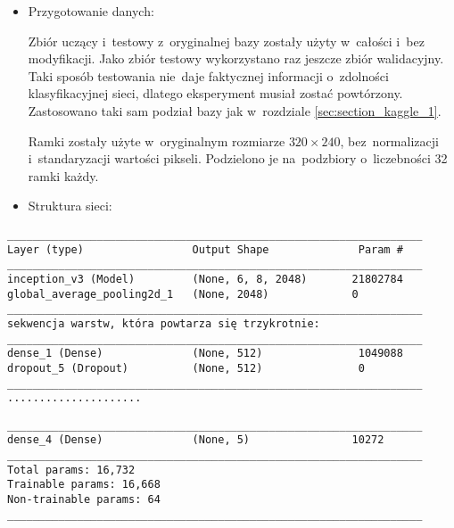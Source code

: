 {\parindent0pt %
\begin{itemize}
\item Przygotowanie danych:

Zbiór uczący i~testowy z~oryginalnej bazy zostały użyty w~całości i~bez modyfikacji. Jako zbiór testowy wykorzystano raz jeszcze zbiór walidacyjny. Taki sposób testowania nie~daje faktycznej informacji o~zdolności klasyfikacyjnej sieci, dlatego eksperyment musiał zostać powtórzony. Zastosowano taki sam podział bazy jak w~rozdziale \ref{sec:section_kaggle_1}.

Ramki zostały użyte w~oryginalnym rozmiarze $320\times240$, bez~normalizacji i~standaryzacji wartości pikseli. Podzielono je na~podzbiory o~liczebności 32 ramki każdy.
\item Struktura sieci:
\end{itemize}

\newsavebox\myvfff
\begin{lrbox}{\myvfff}
\setlength{\myminipagewidth}{0.9\linewidth} %
\setlength{\myminipagecentering}{(\linewidth-\myminipagewidth)/2}
\noindent\hspace{\myminipagecentering}\begin{minipage}{\myminipagewidth}
\begin{verbatim}
_________________________________________________________________
Layer (type)                 Output Shape              Param #   
_________________________________________________________________
inception_v3 (Model)         (None, 6, 8, 2048)       21802784  
global_average_pooling2d_1   (None, 2048)             0           
_________________________________________________________________
sekwencja warstw, która powtarza się trzykrotnie:
_________________________________________________________________
dense_1 (Dense)              (None, 512)               1049088     
dropout_5 (Dropout)          (None, 512)               0        
_________________________________________________________________
.....................

\end{verbatim} 
\end{minipage}\end{lrbox}
\resizebox{0.75\textwidth}{!}{\usebox\myvfff}

\newsavebox\myvff
\begin{lrbox}{\myvff}
\setlength{\myminipagewidth}{0.9\linewidth} %
\setlength{\myminipagecentering}{(\linewidth-\myminipagewidth)/2}
\noindent\hspace{\myminipagecentering}\begin{minipage}{\myminipagewidth}
\begin{verbatim}
_________________________________________________________________
dense_4 (Dense)              (None, 5)                10272     
_________________________________________________________________
Total params: 16,732
Trainable params: 16,668
Non-trainable params: 64
_________________________________________________________________
\end{verbatim} 
\end{minipage}\end{lrbox}
\resizebox{0.75\textwidth}{!}{\usebox\myvff}

}
